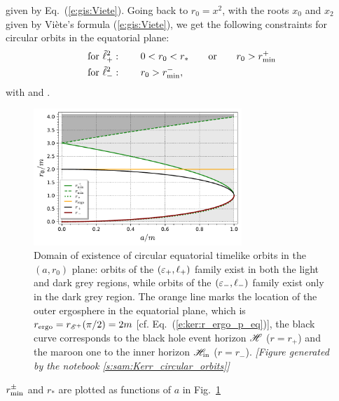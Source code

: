 given by Eq.~(\ref{e:gis:Viete}).
Going back to $r_0 = x^2$, with the roots $x_0$ and $x_2$ given by
Viète's formula (\ref{e:gis:Viete}), we get the following constraints
for circular orbits in the equatorial plane:
\begin{subequations}
\label{e:gek:range_circ}
\begin{align}
    & \mbox{for}\ \tilde{\ell}^2_+:\qquad
    0 < r_0 < r_* \qquad\mbox{or}\qquad r_0 > r_{\rm min}^+ \label{e:gek:range_circ_plus} \\
    & \mbox{for}\ \tilde{\ell}^2_-:\qquad r_0 > r_{\rm min}^- , \label{e:gek:range_circ_minus}
\end{align}
\end{subequations}
with
\be \label{e:gek:def_r_min_pm}
\ee
and
\be \label{e:gek:def_r_star}
    .
\ee
\begin{figure}
\centerline{\includegraphics[width=0.7\textwidth]{gek_circ_orb_lim.pdf}}
\caption[]{\label{f:gek:circ_orb_lim} \footnotesize
Domain of existence of circular equatorial timelike orbits in the $(a, r_0)$ plane:
orbits of the $(\varepsilon_+,\ell_+)$ family exist in both the light and dark grey regions,
while orbits of the $(\varepsilon_-,\ell_-)$ family exist only in the dark grey region.
The orange line marks
the location of the outer ergosphere in the equatorial plane, which is
$r_{\rm ergo} = r_{\mathscr{E}^+}(\pi/2) = 2m$ [cf. Eq.~(\ref{e:ker:r_ergo_p_eq})],
the black curve corresponds to the black hole event horizon $\mathscr{H}$
($r=r_+$) and the maroon one to the inner horizon
$\mathscr{H}_{\rm in}$ ($r=r_-$).
\textsl{[Figure generated by the notebook \ref{s:sam:Kerr_circular_orbits}]}
}
\end{figure}
$r_{\rm min}^\pm$ and $r_*$ are plotted as functions of $a$ in Fig.~\ref{f:gek:circ_orb_lim}
